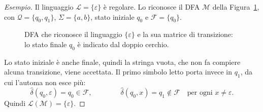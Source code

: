 \documentclass[a4paper, 11pt, oneside]{book}
\theoremstyle{formale}
\newenvironment{esempio}
    {\begin{proof}[\textit{Esempio}]\renewcommand{\qedsymbol}{$\diamond$}}
    {\end{proof}}
\begin{document}
    \begin{esempio}
        Il linguaggio $\mathcal{L} = \{\varepsilon\}$ \`e regolare. Lo riconosce il DFA
        $\mathcal{M}$ della Figura~\ref{fig:dfa-epsilon}, con
        $\mathcal{Q} = \{q_0, q_1\}$, $\Sigma = \{a, b\}$, stato iniziale $q_0$ e
        $\mathcal{F} = \{q_0\}$.

        \begin{figure}[H]
            \centering
            \caption{DFA che riconosce il linguaggio $\{\varepsilon\}$ e la sua matrice di
                transizione: lo stato finale $q_0$ \`e indicato dal doppio cerchio.}
            \label{fig:dfa-epsilon}
        \end{figure}

        Lo stato iniziale \`e anche finale, quindi la stringa vuota, che non fa compiere
        alcuna transizione, viene accettata. Il primo simbolo letto porta invece in $q_1$,
        da cui l'automa non esce pi\`u:
        \begin{equation*}
            \hat{\delta}(q_0, \varepsilon) = q_0 \in \mathcal{F},
            \qquad\qquad
            \hat{\delta}(q_0, x) = q_1 \notin \mathcal{F}
            \quad \text{per ogni } x \neq \varepsilon.
        \end{equation*}
        Quindi $\mathcal{L}(\mathcal{M}) = \{\varepsilon\}$.
    \end{esempio}
\end{document}
